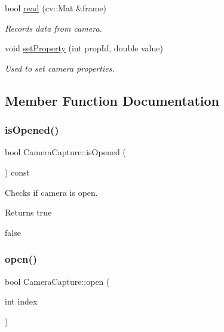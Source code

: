 \begin{DoxyCompactItemize}
bool \hyperlink{classCameraCapture_a3a1d86aca613881d8cd06d3f7b85440f}{read} (cv\+::\+Mat \&frame)
\begin{DoxyCompactList}\small\item\em Records data from camera. \end{DoxyCompactList}\item 
void \hyperlink{classCameraCapture_af82994a1857ad331f8d9d24b3ae24962}{set\+Property} (int prop\+Id, double value)
\begin{DoxyCompactList}\small\item\em Used to set camera properties. \end{DoxyCompactList}\end{DoxyCompactItemize}


\subsection{Member Function Documentation}
\mbox{\label{classCameraCapture_af7fbe43ef6352fae2ca2458a60cd8b9f}} 
\subsubsection{\texorpdfstring{is\+Opened()}{isOpened()}}
{\footnotesize\ttfamily bool Camera\+Capture\+::is\+Opened (\begin{DoxyParamCaption}{ }\end{DoxyParamCaption}) const}



Checks if camera is open. 

\begin{DoxyReturn}{Returns}
true 

false 
\end{DoxyReturn}
\mbox{\label{classCameraCapture_a1a0212fc06b71d35e613b3c781f0814b}} 
\subsubsection{\texorpdfstring{open()}{open()}}
{\footnotesize\ttfamily bool Camera\+Capture\+::open (\begin{DoxyParamCaption}\item[{int}]{index }\end{DoxyParamCaption})}



